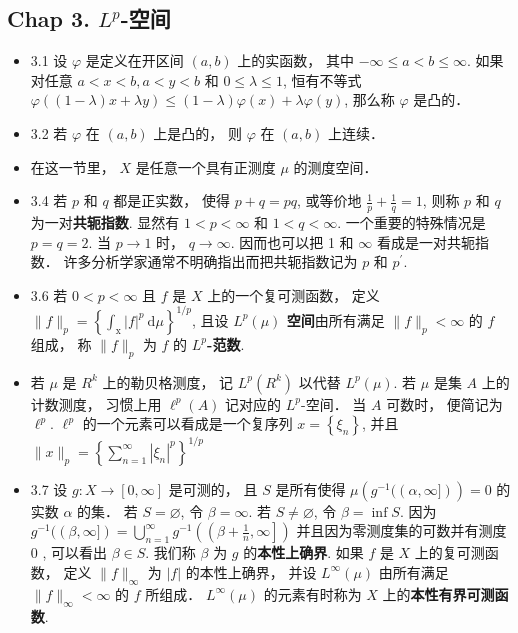 \subsection{Chap 3. $L^p$-空间}

\begin{itemize}
\item 3.1 设 $\varphi$ 是定义在开区间 $(a, b)$ 上的实函数， 其中 $-\infty \leqslant a<b \leqslant \infty$. 如果对任意 $a<x<b, a<y<b$ 和 $0 \leqslant \lambda \leqslant 1$, 恒有不等式 $\varphi((1-\lambda) x+\lambda y) \leqslant(1-\lambda) \varphi(x)+\lambda \varphi(y)$, 那么称 $\varphi$ 是凸的．

\item 3.2 若 $\varphi$ 在 $(a, b)$ 上是凸的， 则 $\varphi$ 在 $(a, b)$ 上连续．

\item 在这一节里， $X$ 是任意一个具有正测度 $\mu$ 的测度空间．

\item 3.4 若 $p$ 和 $q$ 都是正实数， 使得 $p+q=p q$, 或等价地 $\frac{1}{p}+\frac{1}{q}=1$, 则称 $p$ 和 $q$ 为一对\textbf{共轭指数}. 显然有 $1<p<\infty$ 和 $1<q<\infty$. 一个重要的特殊情况是 $p=q=2$. 当 $p \rightarrow 1$ 时， $q \rightarrow \infty$. 因而也可以把 1 和 $\infty$ 看成是一对共轭指数． 许多分析学家通常不明确指出而把共轭指数记为 $p$ 和 $p^{\prime}$.

\item 3.6 若 $0<p<\infty$ 且 $f$ 是 $X$ 上的一个复可测函数， 定义 $\|f\|_{p}=\left\{\int_{\mathrm{x}}|f|^{p} \mathrm{~d} \mu\right\}^{1 / p}$, 且设 \textbf{$L^{p}(\mu)$ 空间}由所有满足 $\|f\|_{p}<\infty$ 的 $f$ 组成， 称 $\|f\|_{p}$ 为 $f$ 的 \textbf{$L^{p}$-范数}.

\item 若 $\mu$ 是 $R^{k}$ 上的勒贝格测度， 记 $L^{p}\left(R^{k}\right)$ 以代替 $L^{p}(\mu)$. 若 $\mu$ 是集 $A$ 上的计数测度， 习惯上用 $\ell^{p}(A)$ 记对应的 $L^{p}$-空间． 当 $A$ 可数时， 便简记为 $\ell^{p}$. $\ell^{p}$ 的一个元素可以看成是一个复序列 $x=\left\{\xi_{n}\right\}$, 并且 $\|x\|_{p}=\left\{\sum_{n=1}^{\infty}\left|\xi_{n}\right|^{p}\right\}^{1 / p}$

\item 3.7 设 $g: X \rightarrow[0, \infty]$ 是可测的， 且 $S$ 是所有使得 $\mu\left(g^{-1}((\alpha, \infty])\right)=0$ 的实数 $\alpha$ 的集． 若 $S=\varnothing$, 令 $\beta=\infty$. 若 $S \neq \varnothing$, 令 $\beta=\inf S$. 因为 $g^{-1}((\beta, \infty])=\bigcup_{n=1}^{\infty} g^{-1}\left(\left(\beta+\frac{1}{n}, \infty\right]\right)$ 并且因为零测度集的可数并有测度 0 , 可以看出 $\beta \in S$. 我们称 $\beta$ 为 $g$ 的\textbf{本性上确界}. 如果 $f$ 是 $X$ 上的复可测函数， 定义 $\|f\|_{\infty}$ 为 $|f|$ 的本性上确界， 并设 $L^{\infty}(\mu)$ 由所有满足 $\|f\|_{\infty}<\infty$ 的 $f$ 所组成． $L^{\infty}(\mu)$ 的元素有时称为 $X$ 上的\textbf{本性有界可测函数}.


\end{itemize}
